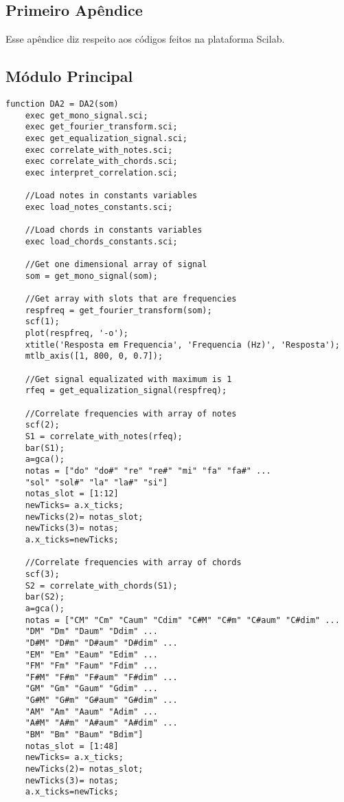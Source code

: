 \begin{apendicesenv}

\partapendices

\chapter{Primeiro Apêndice}

Esse apêndice diz respeito aos códigos feitos na plataforma Scilab.

\section{Módulo Principal}
\label{sec:moduloprincipal}
\begin{lstlisting}
function DA2 = DA2(som)
	exec get_mono_signal.sci;
	exec get_fourier_transform.sci;
	exec get_equalization_signal.sci;
	exec correlate_with_notes.sci;
	exec correlate_with_chords.sci;
	exec interpret_correlation.sci;

	//Load notes in constants variables
	exec load_notes_constants.sci;

	//Load chords in constants variables
	exec load_chords_constants.sci;

	//Get one dimensional array of signal
	som = get_mono_signal(som);

	//Get array with slots that are frequencies
	respfreq = get_fourier_transform(som);
	scf(1);
	plot(respfreq, '-o');
	xtitle('Resposta em Frequencia', 'Frequencia (Hz)', 'Resposta');
	mtlb_axis([1, 800, 0, 0.7]);

	//Get signal equalizated with maximum is 1
	rfeq = get_equalization_signal(respfreq);

	//Correlate frequencies with array of notes
	scf(2);
	S1 = correlate_with_notes(rfeq);
	bar(S1);
	a=gca();
	notas = ["do" "do#" "re" "re#" "mi" "fa" "fa#" ...
	"sol" "sol#" "la" "la#" "si"]
	notas_slot = [1:12]
	newTicks= a.x_ticks;
	newTicks(2)= notas_slot;
	newTicks(3)= notas;
	a.x_ticks=newTicks;

	//Correlate frequencies with array of chords
	scf(3);
	S2 = correlate_with_chords(S1);
	bar(S2);
	a=gca();
	notas = ["CM" "Cm" "Caum" "Cdim" "C#M" "C#m" "C#aum" "C#dim" ...
	"DM" "Dm" "Daum" "Ddim" ...
	"D#M" "D#m" "D#aum" "D#dim" ...
	"EM" "Em" "Eaum" "Edim" ...
	"FM" "Fm" "Faum" "Fdim" ...
	"F#M" "F#m" "F#aum" "F#dim" ...
	"GM" "Gm" "Gaum" "Gdim" ...
	"G#M" "G#m" "G#aum" "G#dim" ...
	"AM" "Am" "Aaum" "Adim" ...
	"A#M" "A#m" "A#aum" "A#dim" ...
	"BM" "Bm" "Baum" "Bdim"]
	notas_slot = [1:48]
	newTicks= a.x_ticks;
	newTicks(2)= notas_slot;
	newTicks(3)= notas;
	a.x_ticks=newTicks;


\end{lstlisting}
\end{apendicesenv}
